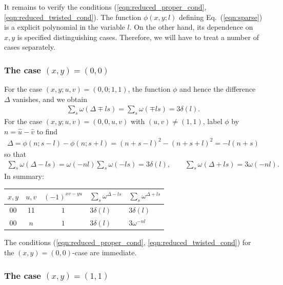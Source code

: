 \documentclass[aps,nofootinbib,floatfix,a4paper]{revtex4}
\newcommand{\1}{\mbox{$\mathbf{1}$}}
\begin{document}
It remains to verify the conditions (\ref{eqn:reduced_proper_cond}, \ref{eqn:reduced_twisted_cond}).
The function $\phi(x,y;l)$ defining Eq.~(\ref{eqn:sparse}) is a explicit polynomial in the variable $l$.
On the other hand, its dependence on $x,y$ is specified distinguishing cases.
Therefore, we will have to treat a number of cases separately.



\subsubsection{The case $(x,y)=(0,0)$}


For the case $(x,y;u,v)=(0,0;1,1)$, the function $\phi$ and hence the difference $\Delta$ vanishes, and we obtain
\begin{align*}
	\sum_{s} \omega(\Delta\mp ls)
	=
	\sum_{s} \omega(\mp ls)
	=
	3\delta(l).
\end{align*}
For the case $(x,y;u,v)=(0,0,u,v)$ with $(u,v)\neq (1,1)$, label $\phi$ by $n=\hat u - \hat v$ to find
\begin{align}\label{eqn:00n}
	\Delta
	=
	\phi(n;s-l)
	-
	\phi(n;s+l)
	=
	(n+s-l)^2
	-
	(n+s+l)^2
	=
	-l(n+s)
\end{align}
so that 
\begin{align*}
	\sum_{s} \omega(\Delta-ls)
	=
	\omega(-nl)
	\sum_{s} \omega(-ls)
	=3\delta(l)
	,
	\qquad
	\sum_{s} \omega(\Delta+ls)
	=
	3
	\omega(-nl)
	.
\end{align*}
In summary:
\begin{center}
	\begin{tabular}{|c|c|c||l|l|}
		\hline
		$x,y$ & $u,v$ & $(-1)^{xv-yu}$ & $\sum_s \omega^{\Delta-ls}$ & $\sum_s\omega^{\Delta+ls}$ \\
		\hline
		00&11  & $1$	&  $3\delta(l)$   & $3\delta(l)$     \\ 
		00&$n$ & $1$	&  $3\delta(l)$   & $3\omega^{-nl}$  \\ 
		\hline
	\end{tabular}
\end{center}
The conditions (\ref{eqn:reduced_proper_cond}, \ref{eqn:reduced_twisted_cond}) for the $(x,y)=(0,0)$-case are immediate.

\subsubsection{The case $(x,y)=(1,1)$}
\end{document}
